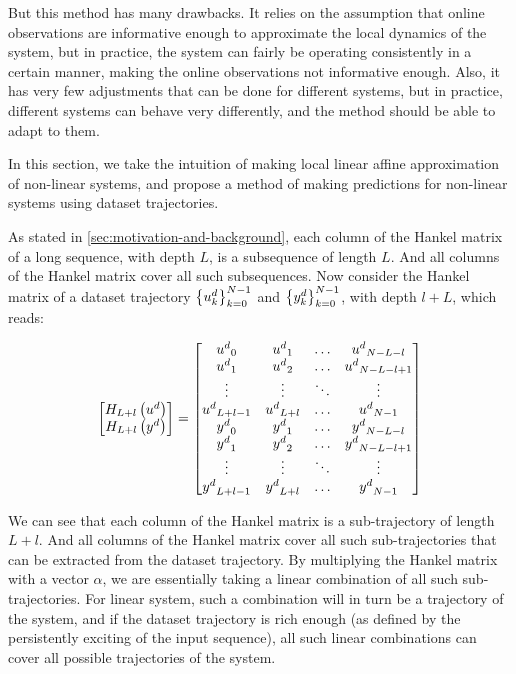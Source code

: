 But this method has many drawbacks.
It relies on the assumption that online observations are informative enough to approximate the local dynamics of the system, but in practice, the system can fairly be operating consistently in a certain manner, making the online observations not informative enough.
Also, it has very few adjustments that can be done for different systems, but in practice, different systems can behave very differently, and the method should be able to adapt to them.

In this section, we take the intuition of making local linear affine approximation of non-linear systems, and propose a method of making predictions for non-linear systems using dataset trajectories.

As stated in \cref{sec:motivation-and-background}, each column of the Hankel matrix of a long sequence, with depth $L$, is a subsequence of length $L$.
And all columns of the Hankel matrix cover all such subsequences.
Now consider the Hankel matrix of a dataset trajectory $\left\{u^d_k\right\}_{k=0}^{N-1}$ and $\left\{y^d_k\right\}_{k=0}^{N-1}$, with depth $l+L$, which reads:

\begin{equation*}
    \begin{bmatrix}
        H_{L+l}\left( {u^d} \right) \\
        H_{L+l}\left( {y^d} \right)
    \end{bmatrix} = \begin{bmatrix}
        {u^d}_0 & {u^d}_1 & \ldots & {u^d}_{N-L-l} \\
        {u^d}_1 & {u^d}_2 & \ldots & {u^d}_{N-L-l+1} \\
        \vdots & \vdots & \ddots & \vdots \\
        {u^d}_{L+l-1} & {u^d}_{L+l} & \ldots & {u^d}_{N-1} \\
        {y^d}_0 & {y^d}_1 & \ldots & {y^d}_{N-L-l} \\
        {y^d}_1 & {y^d}_2 & \ldots & {y^d}_{N-L-l+1} \\
        \vdots & \vdots & \ddots & \vdots \\
        {y^d}_{L+l-1} & {y^d}_{L+l} & \ldots & {y^d}_{N-1}
    \end{bmatrix}
\end{equation*}

We can see that each column of the Hankel matrix is a sub-trajectory of length $L+l$.
And all columns of the Hankel matrix cover all such sub-trajectories that can be extracted from the dataset trajectory.
By multiplying the Hankel matrix with a vector $\alpha$, we are essentially taking a linear combination of all such sub-trajectories.
For linear system, such a combination will in turn be a trajectory of the system, and if the dataset trajectory is rich enough (as defined by the persistently exciting of the input sequence), all such linear combinations can cover all possible trajectories of the system.


